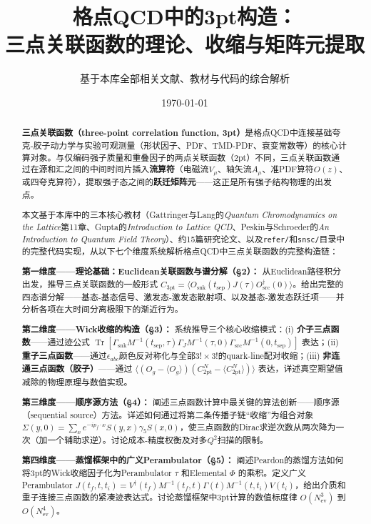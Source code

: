 \documentclass[12pt,a4paper]{ctexart}
\title{\heiti 格点QCD中的3pt构造：\\
三点关联函数的理论、收缩与矩阵元提取}
\author{基于本库全部相关文献、教材与代码的综合解析}
\date{\today}
\theoremstyle{definition}
\begin{document}
\maketitle

\begin{abstract}
\noindent
\textbf{三点关联函数（three-point correlation function, 3pt）}是格点QCD中连接基础夸克-胶子动力学与实验可观测量（形状因子、PDF、TMD-PDF、衰变常数等）的核心计算对象。与仅编码强子质量和重叠因子的两点关联函数（2pt）不同，三点关联函数通过在源和汇之间的中间时间片插入\textbf{流算符}（电磁流$V_\mu$、轴矢流$A_\mu$、准PDF算符$O(z)$、或四夸克算符），提取强子态之间的\textbf{跃迁矩阵元}——这正是所有强子结构物理的出发点。

本文基于本库中的三本核心教材（Gattringer与Lang的\textit{Quantum Chromodynamics on the Lattice}第11章、Gupta的\textit{Introduction to Lattice QCD}、Peskin与Schroeder的\textit{An Introduction to Quantum Field Theory}）、约15篇研究论文、以及\texttt{refer/}和\texttt{snsc/}目录中的完整代码实现，从以下七个维度系统解析格点QCD中三点关联函数的完整构造链：

\textbf{第一维度——理论基础：Euclidean关联函数与谱分解（§2）：}
从Euclidean路径积分出发，推导三点关联函数的一般形式 $C_{3\text{pt}} = \langle O_{\text{snk}}(t_{\text{sep}}) J(\tau) O_{\text{src}}^\dagger(0) \rangle$。给出完整的四态谱分解——基态-基态信号、激发态-激发态散射项、以及基态-激发态跃迁项——并分析各项在大时间分离极限下的渐近行为。

\textbf{第二维度——Wick收缩的构造（§3）：}
系统推导三个核心收缩模式：(i) \textbf{介子三点函数}——通过迹公式 $\operatorname{Tr}[\Gamma_{\text{snk}} M^{-1}(t_{\text{sep}},\tau) \Gamma_J M^{-1}(\tau,0) \Gamma_{\text{src}} M^{-1}(0,t_{\text{sep}})]$ 表达；(ii) \textbf{重子三点函数}——通过$\epsilon_{abc}$颜色反对称化与全部$3! \times 3!$的quark-line配对收缩；(iii) \textbf{非连通三点函数（胶子）}——通过 $\langle (O_g - \langle O_g\rangle)(C_{2\text{pt}}^N - \langle C_{2\text{pt}}^N\rangle) \rangle$ 表达，详述真空期望值减除的物理原理与数值实现。

\textbf{第三维度——顺序源方法（§4）：}
阐述三点函数计算中最关键的算法创新——顺序源（sequential source）方法。详述如何通过将第二条传播子链``收缩''为组合对象 $\Sigma(y,0) = \sum_x e^{-ip_f \cdot x} S(y,x)\gamma_5 S(x,0)$，使三点函数的Dirac求逆次数从两次降为一次（加一个辅助求逆）。讨论成本-精度权衡及对多$Q^2$扫描的限制。

\textbf{第四维度——蒸馏框架中的广义Perambulator（§5）：}
阐述Peardon的蒸馏方法如何将3pt的Wick收缩因子化为Perambulator $\tau$ 和Elemental $\Phi$ 的乘积。定义广义Perambulator $J(t_f, t, t_i) = V^\dagger(t_f) M^{-1}(t_f,t) \Gamma(t) M^{-1}(t,t_i) V(t_i)$，给出介质和重子连接三点函数的紧凑迹表达式。讨论蒸馏框架中3pt计算的数值标度律 $O(N_{\text{ev}}^3)$ 到 $O(N_{\text{ev}}^4)$。


\end{abstract}
\end{document}
